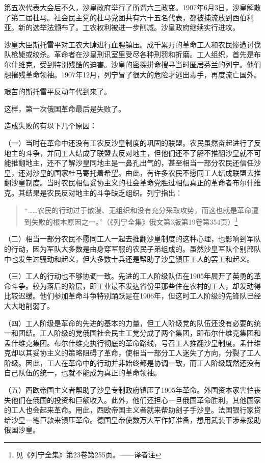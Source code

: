 第五次代表大会后不久，沙皇政府举行了所谓六三政变。1907年6月3日，沙皇解散了笫二届杜马。社会民主党的杜马党团共有六十五名代表，都被捕流放到西伯利亚。新的选举法颁布了。工农权利被进一步削减。沙皇政府继续实行进攻。

沙皇大臣斯托雷平对工农大肆进行血腥镇压。成千累万的革命工人和农民惨遭讨伐队枪毙或绞杀。革命者在沙皇刑讯室里受尽各种刑罚和折磨。工人组织，首先是布尔什维克，受到特别残酷的迫害。沙皇的密探拼命搜寻当时匿居芬兰的列宁。他们想摧残革命领袖。1907年12月，列宁冒了很大的危险才逃出毒手，再度流亡国外。

艰苦的斯托雷平反动年代到来了。

这样，第一次俄国革命最后是失败了。

造成失败的有以下几个原因：

（一）当时在革命中还没有工农反沙皇制度的巩固的联盟。农民虽然奋起进行了反地主的斗争，并同工人结成了联盟去反对地主，但他们还不了解不推翻沙皇就不可能推翻地主，还不了解沙皇同地主是一鼻孔出气的，甚至相当一部分农民还信任沙皇，还对沙皇的国家杜马寄托着希望。由此，有许多农民不愿同工人结成联盟去推翻沙皇制度。当时农民相信妥协主义的社会革命党胜过相信真正的革命者布尔什维克。其结果是农民反对地主的斗争缺乏组织。列宁指出：

\begin{quotation}
“……农民的行动过于散漫、无组织和没有充分采取攻势，而这也就是革命遭到失败的根本原因之一。”（《列宁全集》俄文第3版第19卷第354页）\footnote{见《列宁全集》第23卷第255页。——译者注}
\end{quotation}

（二）相当一部分农民不愿同工人一起去推翻沙皇制度的这种心理，也影响到军队的行动，因为军队大多数是由身穿军服的农民子弟组成的。虽然沙皇军队个别部队中也发生过骚动和起义，但大多数士兵还是帮助了沙皇镇压工人的罢工和起义。

（三）工人的行动也不够协调一致。先进的工人阶级队伍在1905年展开了英勇的革命斗争。较为落后的阶层，即工业最不发达省份里那些住在农村的工人，却发动得比较迟缓。他们参加革命斗争特别踊跃是在1906年，但这时工人阶级的先锋队已经大大地削弱了。

（四）工人阶级是革命的先进的基本的力量，但工人阶级党的队伍还没有必要的统一和团结。工人阶级的党俄国社会民主工党分成了两个集团，即布尔什维克集团和孟什维克集团。布尔什维克执行彻底的革命路线，号召工人推翻沙皇制度。孟什维克却以其妥协主义的策略阻碍了革命，使相当一部分工人迷失了方向，分裂了工人阶级。因此，工人在革命中的行动并非始终都是协调一致，而工人阶级既然还没有自己队伍的统一，也就不能成为真正的革命领袖。

（五）西欧帝国主义者帮助了沙皇专制政府镇压了1905年革命。外国资本家害怕丧失他们在俄国的投资和巨额收入。此外，他们还担心一旦俄国革命胜利，其他国家的工人也会起来革命。用此，西欧帝国主义者就来帮助刽子手沙皇。法国银行家贷给沙皇一笔巨款来镇压革命。德国皇帝使数万大军作好准备，想用武装干涉来援助俄国沙皇。


